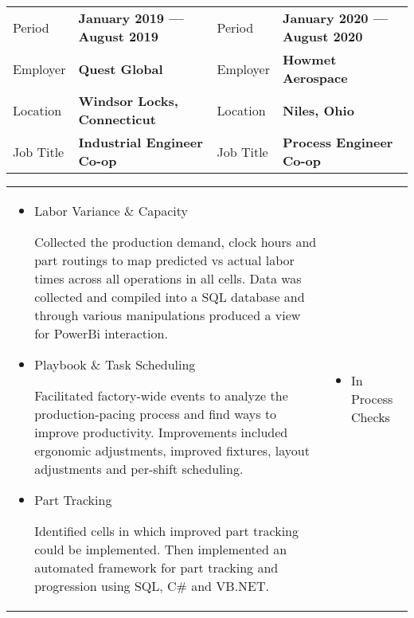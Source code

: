 \documentclass[a4paper, oneside, final, 10pt]{scrartcl} %
\newcommand{\gray}{\rowcolor[gray]{.90}} %
\newcommand{\Csharp}{C{\lserif\#}}
\begin{document}
\begin{center}
\begin{tabularx}{0.97\linewidth}{XX|XX}
    \gray{}Period    & \textbf{January 2019 --- August 2019} & Period & \textbf{January 2020 --- August 2020}\\
    \gray{}Employer  & \textbf{Quest Global}                 & Employer & \textbf{Howmet Aerospace} \\
    \gray{}Location  & \textbf{Windsor Locks, Connecticut}   & Location & \textbf{Niles, Ohio}\\
    \gray{}Job Title & \textbf{Industrial Engineer Co-op}          & Job Title & \textbf{Process Engineer Co-op}\\
\end{tabularx}

\begin{tabularx}{0.97\linewidth}{X|X}
    \vspace{-10pt}
    \begin{itemize}\setlength\itemsep{0em}
        \item{Labor Variance \&{} Capacity}
        \begin{sloppypar}
            Collected the production demand, clock hours and part routings to map predicted vs actual labor times across all operations in all cells.
            Data was collected and compiled into a SQL database and through various manipulations produced a view for PowerBi interaction.
        \end{sloppypar}
        \item{Playbook \&{} Task Scheduling}
        \begin{sloppypar}
            Facilitated factory-wide events to analyze the production-pacing process and find ways to improve productivity.
            Improvements included ergonomic adjustments, improved fixtures, layout adjustments and per-shift scheduling.
        \end{sloppypar}
        \item{Part Tracking}
        \begin{sloppypar}
            Identified cells in which improved part tracking could be implemented.
            Then implemented an automated framework for part tracking and progression using SQL, \Csharp{} and VB.NET.
        \end{sloppypar}
    \end{itemize} & \vspace{-10pt} \begin{itemize}\setlength\itemsep{0em}
        \item{In Process Checks}

\end{itemize}
\end{tabularx}
\end{center}
\end{document}
